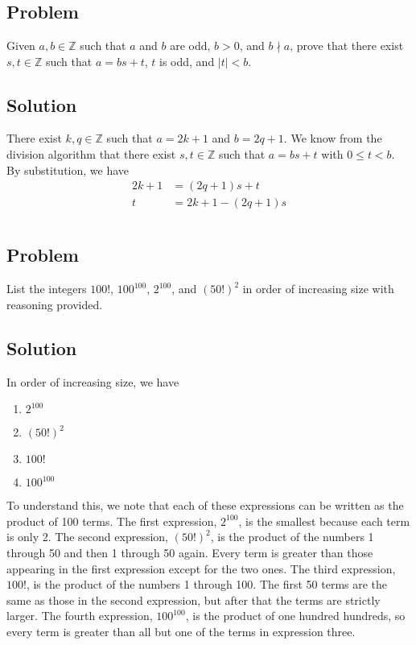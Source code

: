 \documentclass[12pt]{article}
\newcommand{\abs}  [1]{\left|       #1 \right|      }
\newcommand{\Z}    [0]{\mathbb{Z}                   }
\begin{document}
\section{}

\subsection{Problem}
Given $a, b \in \Z$ such that $a$ and $b$ are odd, $b > 0$, and $b \nmid a$, prove that there exist $s, t \in \Z$ such that $a = bs + t$, $t$ is odd, and $\abs{t} < b$.

\subsection{Solution}
There exist $k, q \in \Z$ such that $a = 2k + 1$ and $b = 2q + 1$. We know from the division algorithm that there exist $s, t \in \Z$ such that $a = bs + t$ with $0 \leq t < b$. By substitution, we have
\begin{align*}
    2k + 1 &= (2q + 1)s + t \\
    t &= 2k + 1 - (2q + 1)s
\end{align*}


\section{}

\subsection{Problem}
List the integers $100!$, $100^{100}$, $2^{100}$, and $(50!)^2$ in order of increasing size with reasoning provided.

\subsection{Solution}
In order of increasing size, we have
\begin{enumerate}
    \item $2^{100}$
    \item $(50!)^2$
    \item $100!$
    \item $100^{100}$
\end{enumerate}
To understand this, we note that each of these expressions can be written as the product of 100 terms. The first expression, $2^{100}$, is the smallest because each term is only 2. The second expression, $(50!)^2$, is the product of the numbers 1 through 50 and then 1 through 50 again. Every term is greater than those appearing in the first expression except for the two ones. The third expression, $100!$, is the product of the numbers 1 through 100. The first 50 terms are the same as those in the second expression, but after that the terms are strictly larger. The fourth expression, $100^{100}$, is the product of one hundred hundreds, so every term is greater than all but one of the terms in expression three.
\end{document}
